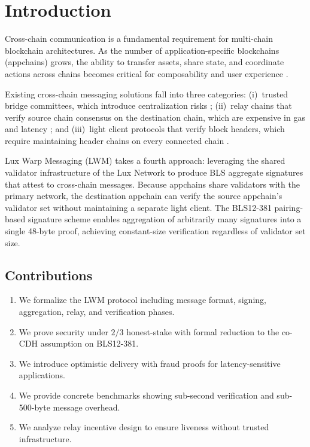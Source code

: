 \section{Introduction}


Cross-chain communication is a fundamental requirement for multi-chain blockchain architectures. As the number of application-specific blockchains (appchains) grows, the ability to transfer assets, share state, and coordinate actions across chains becomes critical for composability and user experience \cite{wood2016polkadot, kwon2016cosmos}.

Existing cross-chain messaging solutions fall into three categories: (i)~trusted bridge committees, which introduce centralization risks \cite{zamyatin2021bridge}; (ii)~relay chains that verify source chain consensus on the destination chain, which are expensive in gas and latency \cite{kwon2016cosmos}; and (iii)~light client protocols that verify block headers, which require maintaining header chains on every connected chain \cite{kiayias2016proofs}.

Lux Warp Messaging (LWM) takes a fourth approach: leveraging the shared validator infrastructure of the Lux Network to produce BLS aggregate signatures that attest to cross-chain messages. Because appchains share validators with the primary network, the destination appchain can verify the source appchain's validator set without maintaining a separate light client. The BLS12-381 pairing-based signature scheme \cite{boneh2001bls, boneh2018compact} enables aggregation of arbitrarily many signatures into a single 48-byte proof, achieving constant-size verification regardless of validator set size.

\subsection{Contributions}

\begin{enumerate}[label=(\roman*)]
    \item We formalize the LWM protocol including message format, signing, aggregation, relay, and verification phases.
    \item We prove security under $2/3$ honest-stake with formal reduction to the co-CDH assumption on BLS12-381.
    \item We introduce optimistic delivery with fraud proofs for latency-sensitive applications.
    \item We provide concrete benchmarks showing sub-second verification and sub-500-byte message overhead.
    \item We analyze relay incentive design to ensure liveness without trusted infrastructure.
\end{enumerate}

